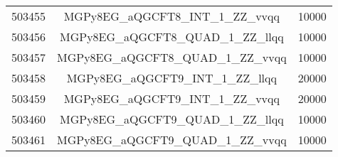 \begin{table}[!htbp]
\begin{center}
\begin{tabular}{c|c|c}
503455 & MGPy8EG\_aQGCFT8\_INT\_1\_ZZ\_vvqq      & 10000 \\
503456 & MGPy8EG\_aQGCFT8\_QUAD\_1\_ZZ\_llqq     & 10000 \\
503457 & MGPy8EG\_aQGCFT8\_QUAD\_1\_ZZ\_vvqq     & 10000 \\
503458 & MGPy8EG\_aQGCFT9\_INT\_1\_ZZ\_llqq      & 20000 \\
503459 & MGPy8EG\_aQGCFT9\_INT\_1\_ZZ\_vvqq      & 20000 \\
503460 & MGPy8EG\_aQGCFT9\_QUAD\_1\_ZZ\_llqq     & 10000 \\
503461 & MGPy8EG\_aQGCFT9\_QUAD\_1\_ZZ\_vvqq     & 10000 \\

\hline
\end{tabular}
\label{tabular:mc_samples_aqgc_8}
\end{center}
\end{table}
